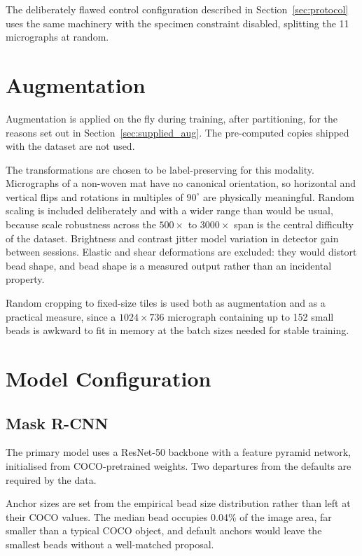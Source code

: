 The deliberately flawed control configuration described in
Section~\ref{sec:protocol} uses the same machinery with the specimen constraint
disabled, splitting the 11 micrographs at random.

\section{Augmentation}

Augmentation is applied on the fly during training, after partitioning, for the
reasons set out in Section~\ref{sec:supplied_aug}. The pre-computed copies shipped
with the dataset are not used.

The transformations are chosen to be label-preserving for this modality. Micrographs
of a non-woven mat have no canonical orientation, so horizontal and vertical flips
and rotations in multiples of $90^{\circ}$ are physically meaningful. Random scaling
is included deliberately and with a wider range than would be usual, because scale
robustness across the $500\times$ to $3000\times$ span is the central difficulty of
the dataset. Brightness and contrast jitter model variation in detector gain between
sessions. Elastic and shear deformations are excluded: they would distort bead shape,
and bead shape is a measured output rather than an incidental property.

Random cropping to fixed-size tiles is used both as augmentation and as a practical
measure, since a $1024 \times 736$ micrograph containing up to 152 small beads is
awkward to fit in memory at the batch sizes needed for stable training.

\section{Model Configuration}

\subsection{Mask R-CNN}

The primary model uses a ResNet-50 backbone with a feature pyramid network,
initialised from COCO-pretrained weights. Two departures from the defaults are
required by the data.

Anchor sizes are set from the empirical bead size distribution rather than left at
their COCO values. The median bead occupies 0.04\% of the image area, far smaller
than a typical COCO object, and default anchors would leave the smallest beads
without a well-matched proposal.


